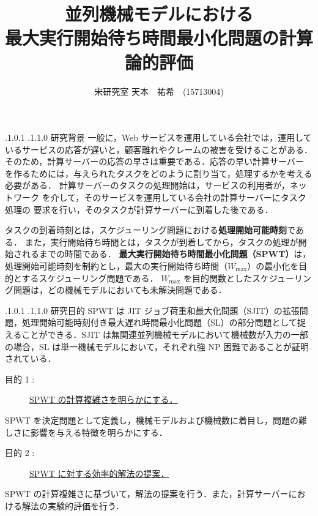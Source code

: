 \documentclass[oneside, 10pt, twocolumn]{jarticle}
\title{\bf{\rm
並列機械モデルにおける\\最大実行開始待ち時間最小化問題の計算論的評価}}
\author{宋研究室
\hspace{15pt}
天本　祐希　(15713004)}
\date{}
\makeatletter
\def\section{\@startsection {section}{1}{\z@}{-3.5ex plus -1ex minus
-.2ex}{2.3 ex plus .2ex}{\large\bf}}
\renewcommand{\section}{
\@startsection{section}{1}{\z@}
{.1\Cvs \@plus.0\Cdp \@minus.1\Cdp}%
{.1\Cvs \@plus.1\Cdp \@minus.0\Cdp}%
{\reset@font\large\bfseries}}      %
\makeatother
\begin{document}
\maketitle
\thispagestyle{empty}
\section{研究背景}
一般に，Web サービスを運用している会社では，運用しているサービスの応答が遅いと，顧客離れやクレームの被害を受けることがある．
そのため，計算サーバーの応答の早さは重要である．応答の早い計算サーバー
を作るためには，与えられたタスクをどのように割り当て，処理するかを考える必要がある．
計算サーバーのタスクの処理開始は，サービスの利用者が，ネットワーク
を介して，そのサービスを運用している会社の計算サーバーにタスク処理の
要求を行い，そのタスクが計算サーバーに到着した後である．

タスクの到着時刻とは，スケジューリング問題における{\bf 処理開始可能時刻}である．
また，実行開始待ち時間とは，タスクが到着してから，タスクの処理が開始されるまでの時間である．
{\bf 最大実行開始待ち時間最小化問題（SPWT）}は，処理開始可能時刻を制約とし，最大の実行開始待ち時間（\mbox{\boldmath $W_{\max}$}）の最小化を目的とするスケジューリング問題である．
$W_{\max}$ を目的関数としたスケジューリング問題は，どの機械モデルにおいても未解決問題である．


\section{研究目的}
SPWT は JIT ジョブ荷重和最大化問題（SJIT）の拡張問題，処理開始可能時刻付き最大遅れ時間最小化問題（SL）の部分問題として捉えることができる．SJIT は無関連並列機械モデルにおいて機械数が入力の一部の場合，SL は単一機械モデルにおいて，それぞれ強 NP 困難であることが証明されている\cite{SJIT}\cite{SL}．
\begin{description}
  \item[目的 1 :]
  \underline{SPWT の計算複雑さを明らかにする．}
\end{description}
SPWT を決定問題として定義し，機械モデルおよび機械数に着目し，問題の難しさに影響を与える特徴を明らかにする．

\begin{description}
  \item[目的 2 :]
  \underline{SPWT に対する効率的解法の提案．}
\end{description}
SPWT の計算複雑さに基づいて，解法の提案を行う．また，計算サーバーにおける解法の実験的評価を行う．
\end{document}
